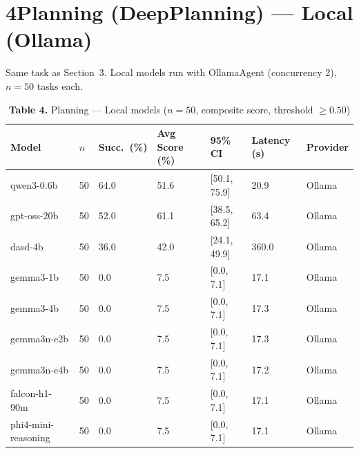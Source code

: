 \documentclass[11pt,letterpaper]{article}
\begin{document}
\vspace{0.4cm}

\section*{4\quad Planning (DeepPlanning) --- Local (Ollama)}

Same task as Section~3. Local models run with OllamaAgent (concurrency 2), $n = 50$ tasks each.

\vspace{0.3cm}

\begin{table}[h!]
\centering
\caption*{\textbf{Table 4.} Planning --- Local models ($n=50$, composite score, threshold $\geq 0.50$)}
\begin{tabular}{l R{0.9cm} R{1.8cm} R{2.2cm} R{2.6cm} R{1.8cm} l}
\toprule
\textbf{Model} & \textbf{$n$} & \textbf{Succ.\ (\%)} & \textbf{Avg Score (\%)} & \textbf{95\% CI} & \textbf{Latency (s)} & \textbf{Provider} \\
\midrule
{} qwen3-0.6b           & 50 & 64.0 & 51.6 & [50.1, 75.9] &  20.9 & Ollama \\
 gpt-oss-20b          & 50 & 52.0 & 61.1 & [38.5, 65.2] &  63.4 & Ollama \\
dasd-4b              & 50 & 36.0 & 42.0 & [24.1, 49.9] & 360.0 & Ollama \\
 gemma3-1b            & 50 &  0.0 &  7.5 & [0.0, 7.1]   &  17.1 & Ollama \\
 gemma3-4b            & 50 &  0.0 &  7.5 & [0.0, 7.1]   &  17.3 & Ollama \\
 gemma3n-e2b          & 50 &  0.0 &  7.5 & [0.0, 7.1]   &  17.3 & Ollama \\
 gemma3n-e4b          & 50 &  0.0 &  7.5 & [0.0, 7.1]   &  17.2 & Ollama \\
 falcon-h1-90m        & 50 &  0.0 &  7.5 & [0.0, 7.1]   &  17.1 & Ollama \\
 phi4-mini-reasoning  & 50 &  0.0 &  7.5 & [0.0, 7.1]   &  17.1 & Ollama \\
\bottomrule
\end{tabular}
\end{table}

\newpage
\end{document}
